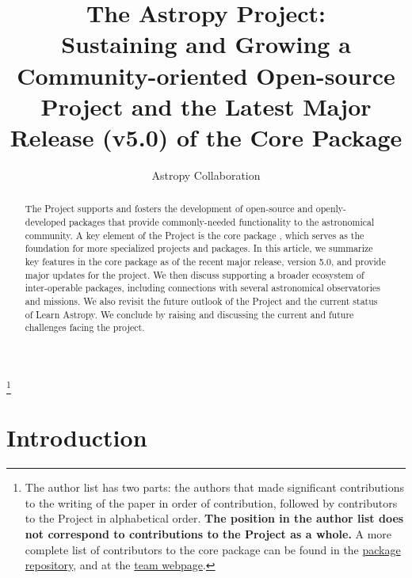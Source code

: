 \documentclass[modern]{aastex631}
\begin{document}
\let\oldtoday\today
\renewcommand{\today}{\oldtoday;\qquad\textnormal{\gitHeader}}

\title{The Astropy Project: \\
       Sustaining and Growing a Community-oriented Open-source Project and
       the Latest Major Release (v5.0) of the Core Package}


\author{Astropy Collaboration}
\noaffiliation
{\let\thefootnote\relax\footnote{{The author list has two parts: the authors that made significant contributions to the writing of the paper in order of contribution, followed by contributors to the \astropy Project in alphabetical order. \textbf{The position in the author list does not correspond to contributions to the \astropy Project as a whole.} A more complete list of contributors to the core package can be found in the \href{https://github.com/astropy/astropy/graphs/contributors}{package repository}, and at the \href{http://www.astropy.org/team.html}{\astropy team webpage}.}}}

% 

\begin{abstract}
The \astropy Project supports and fosters the development of open-source and openly-developed
\python packages that provide commonly-needed functionality to the astronomical
community.
A key element of the \astropy Project is the core package \astropypkg, which serves as the
foundation for more specialized projects and packages.
In this article, we summarize key features in the core package as of the recent major
release, version 5.0, and provide major updates for the project.
We then discuss supporting a broader ecosystem of inter-operable packages,
including connections with several astronomical observatories and missions.
We also revisit the future outlook of the \astropy Project and the current
status of Learn Astropy.
We conclude by raising and discussing the current and future challenges facing the project.
\end{abstract}



\section{Introduction} \label{sec:intro}
\end{document}
